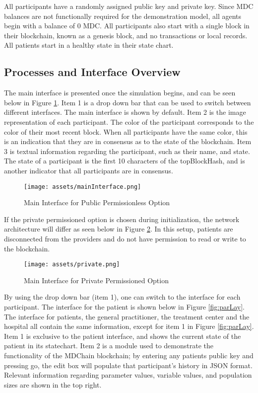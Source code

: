 \documentclass[12pt]{report}
\begin{document}
All participants have a randomly assigned public key and private key. Since MDC balances are not functionally required for the demonstration model, all agents begin with a balance of 0 MDC. All participants also start with a single block in their blockchain, known as a genesis block, and no transactions or local records. All patients start in a healthy state in their state chart.

\subsection{Processes and Interface Overview}
\label{sec:processrx}
The main interface is presented once the simulation begins, and can be seen below in Figure \ref{fig:mainlay}. Item 1 is a drop down bar that can be used to switch between different interfaces. The main interface is shown by default. Item 2 is the image representation of each participant. The color of the participant corresponds to the color of their most recent block. When all participants have the same color, this is an indication that they are in consensus as to the state of the blockchain. Item 3 is textual information regarding the participant, such as their name, and state. The state of a participant is the first 10 characters of the topBlockHash, and is another indicator that all participants are in consensus.

\begin{figure}[!h]
\begin{center}
\texttt{[image: assets/mainInterface.png]}
\end{center}
\caption{Main Interface for Public Permissionless Option}
\label{fig:mainlay}
\end{figure}

If the private permissioned option is chosen during initialization, the network architecture will differ as seen below in Figure \ref{fig:private}. In this setup, patients are disconnected from the providers and do not have permission to read or write to the blockchain.

\begin{figure}[!h]
\begin{center}
\texttt{[image: assets/private.png]}
\end{center}
\caption{Main Interface for Private Permissioned Option}
\label{fig:private}
\end{figure}

By using the drop down bar (item 1), one can switch to the interface for each participant. The interface for the patient is shown below in Figure \ref{fig:parLay}. The interface for patients, the general practitioner, the treatment center and the hospital all contain the same information, except for item 1 in Figure \ref{fig:parLay}. Item 1 is exclusive to the patient interface, and shows the current state of the patient in its statechart. Item 2 is a module used to demonstrate the functionality of the MDChain blockchain; by entering any patients public key and pressing go, the edit box will populate that participant's history in JSON format. Relevant information regarding parameter values, variable values, and population sizes are shown in the top right.
\end{document}
